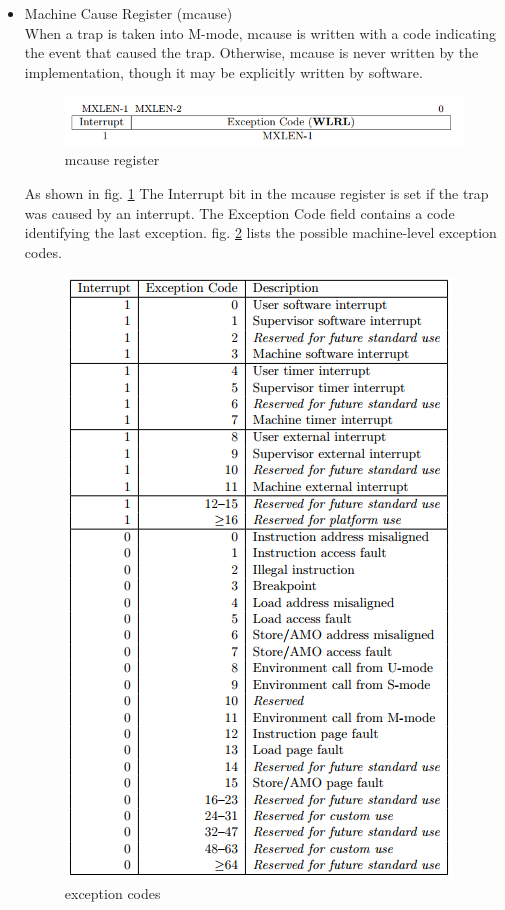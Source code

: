 \documentclass[../main.tex]{subfiles}
\begin{document}
\begin{itemize}
\begin{itemize}
            \item Machine Cause Register (mcause)\\
            When a trap is taken into M-mode, mcause is written with a code indicating the event that caused the trap. Otherwise, mcause is never written by the implementation, though it may be explicitly written by software.\\
            \begin{figure}[h]
            \centering
            \includegraphics[width=10 cm]{diagrams/mcause.png}
            \caption{mcause register}
            \label{fig:mcause}
            \end{figure}As shown in fig. \ref{fig:mcause}
            The Interrupt bit in the mcause register is set if the trap was caused by an interrupt. The Exception Code field contains a code identifying the last exception. 
            fig. \ref{fig:exception-code} lists the possible machine-level exception codes.\\
            \begin{figure}[h!]
            \centering
            \includegraphics[width=10 cm]{diagrams/exception_code.png}
            \caption{exception codes}
            \label{fig:exception-code}
            \end{figure}
            

\end{itemize}
\end{itemize}
\end{document}
